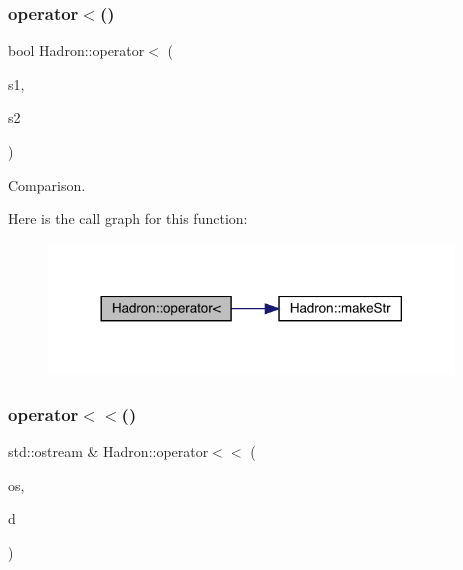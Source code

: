 \subsubsection{\texorpdfstring{operator$<$()}{operator<()}}
{\footnotesize\ttfamily bool Hadron\+::operator$<$ (\begin{DoxyParamCaption}\item[{const \mbox{\hyperlink{structHadron_1_1HadronVertex__t}{Hadron\+Vertex\+\_\+t}} \&}]{s1,  }\item[{const \mbox{\hyperlink{structHadron_1_1HadronVertex__t}{Hadron\+Vertex\+\_\+t}} \&}]{s2 }\end{DoxyParamCaption})}



Comparison. 

Here is the call graph for this function\+:
\nopagebreak
\begin{figure}[H]
\begin{center}
\leavevmode
\includegraphics[width=305pt]{d1/daf/namespaceHadron_a43c37405dc872b3d2d1f477ca914424a_cgraph}
\end{center}
\end{figure}
\mbox{\label{namespaceHadron_ab6f642c04562e34b1b2aa6e4bcfa60e7}} 
\subsubsection{\texorpdfstring{operator$<$$<$()}{operator<<()}\hspace{0.1cm}{\footnotesize\ttfamily [1/48]}}
{\footnotesize\ttfamily std\+::ostream \& Hadron\+::operator$<$$<$ (\begin{DoxyParamCaption}\item[{std\+::ostream \&}]{os,  }\item[{const \mbox{\hyperlink{structHadron_1_1ValTimeSlice__t}{Val\+Time\+Slice\+\_\+t}} \&}]{d }\end{DoxyParamCaption})}



